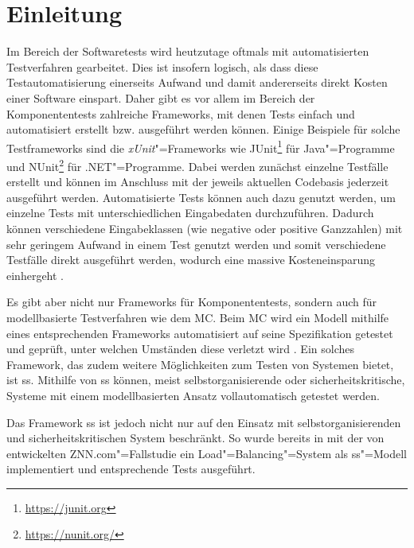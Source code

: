 \chapter{Einleitung}
\label{ch:intro}

Im Bereich der Softwaretests wird heutzutage oftmals mit automatisierten Testverfahren gearbeitet.
Dies ist insofern logisch, als dass diese Testautomatisierung einerseits Aufwand und damit andererseits direkt Kosten einer Software einspart.
Daher gibt es vor allem im Bereich der Komponententests zahlreiche Frameworks, mit denen Tests einfach und automatisiert erstellt bzw. ausgeführt werden können.
Einige Beispiele für solche Testframeworks sind die \emph{xUnit}"=Frameworks wie JUnit\footnote{\url{https://junit.org}} für Java"=Programme und NUnit\footnote{\url{https://nunit.org/}} für .NET"=Programme.
Dabei werden zunächst einzelne Testfälle erstellt und können im Anschluss mit der jeweils aktuellen Codebasis jederzeit ausgeführt werden.
Automatisierte Tests können auch dazu genutzt werden, um einzelne Tests mit unterschiedlichen Eingabedaten durchzuführen.
Dadurch können verschiedene Eingabeklassen (wie negative oder positive Ganzzahlen) mit sehr geringem Aufwand in einem Test genutzt werden und somit verschiedene Testfälle direkt ausgeführt werden, wodurch eine massive Kosteneinsparung einhergeht \cite{Polo2013}.

Es gibt aber nicht nur Frameworks für Komponententests, sondern auch für modellbasierte Testverfahren wie \zB dem \gls{MC}.
Beim \gls{MC} wird ein Modell mithilfe eines entsprechenden Frameworks automatisiert auf seine Spezifikation getestet und geprüft, unter welchen Umständen diese verletzt wird \cite{Grumberg1999,Habermaier2015}.
Ein solches Framework, das zudem weitere Möglichkeiten zum Testen von Systemen bietet, ist \gls{ss}.
Mithilfe von \gls{ss} können, meist selbstorganisierende oder sicherheitskritische, Systeme mit einem modellbasierten Ansatz vollautomatisch getestet werden.

Das Framework \gls{ss} ist jedoch nicht nur auf den Einsatz mit selbstorganisierenden und sicherheitskritischen System beschränkt.
So wurde bereits in \cite{Eberhardinger2017} mit der von \citeauthor{Cheng2008} entwickelten ZNN.com"=Fallstudie \cite{Cheng2008} ein Load"=Balancing"=System als \gls{ss}"=Modell implementiert und entsprechende Tests ausgeführt.

